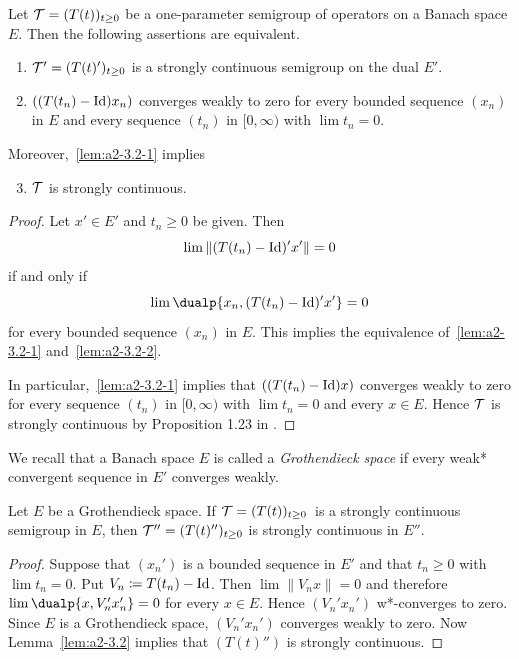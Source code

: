 \begin{lemma}\label{lem:a2-3.2}
Let $\TT = (T(t))_{t \geq 0}$ be a one-parameter semigroup of operators on a Banach space $E$.
Then the following assertions are equivalent.
\begin{enumerate}[\upshape (a)]
\item \label{lem:a2-3.2-1}
$\TT' = (T(t)')_{t \geq 0}$ is a strongly continuous semigroup on the dual $E'$.
\item \label{lem:a2-3.2-2}
$((T(t_{n}) - \operatorname{Id})x_n)$ converges weakly to zero for every bounded sequence $(x_n)$ in $E$ and every sequence $(t_n)$ in $[0,\infty)$ with $\lim t_n = 0$.
\end{enumerate}
Moreover,~\ref{lem:a2-3.2-1}   
implies
\begin{enumerate}[\upshape (a)]
\setcounter{enumi}{2}
\item \label{lem:a2-3.2-3}
$\mathcal{T}$ is strongly continuous. 
\end{enumerate}
\end{lemma}
\begin{proof}
Let $x' \in E'$ and $t_n \geq 0$ be given.
Then 
%
\[
	\lim \|(T(t_n) - \operatorname{Id})'x'\| = 0 
\]
%
if and only if\/ 
%
\[
	\lim \dualp{x_n, (T(t_n) - \Id)'x'} = 0
\]
%
for every bounded sequence $(x_n)$ in $E$.
This implies the equivalence of~\ref{lem:a2-3.2-1}   and~\ref{lem:a2-3.2-2}. 

In particular,~\ref{lem:a2-3.2-1}   implies that $((T(t_n) - \operatorname{Id})x)$ converges weakly to zero for every sequence $(t_n)$ in $[0,\infty)$ with $\lim t_n = 0$ and every $x \in E$.
Hence $\mathcal{T}$ is strongly continuous by Proposition 1.23 in \textcite{davies:1980}.
\end{proof}
We recall that a Banach space $E$ is called a \emph{Grothendieck space} if every weak* convergent sequence in $E'$ converges weakly.
\begin{theorem}\label{thm:a2-3.3}
Let $E$ be a Grothendieck space.
If  $\TT=(T(t))_{t \geq 0}$\, is a strongly continuous semigroup in $E$, then $\TT'' = (T(t)'')_{t \geq 0}$ is strongly continuous in $E''$.
\end{theorem}
\begin{proof}
Suppose that $(x_{n}')$ is a bounded sequence in $E'$ and that $t_{n} \geq 0$ with $\lim t_{n} = 0$.
Put $V_{n} \coloneq T(t_{n}) - \operatorname{Id}$.
Then $\lim \|V_{n}x\| = 0$ and therefore $\lim \dualp{x, V_{n}'x_{n}'} = 0$ for every $x \in E$.
Hence $(V_{n}'x_{n}')$ w*-converges to zero.
Since $E$ is a Grothendieck space, $(V_{n}'x_{n}')$ converges weakly to zero.
Now Lemma~\ref{lem:a2-3.2} implies that $(T(t)'')$ is strongly continuous.
\end{proof}
